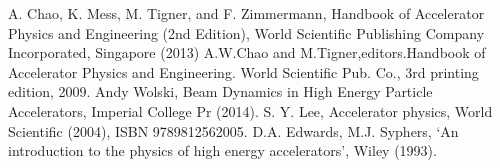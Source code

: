\documentclass[10pt,a4paper]{ltjsarticle}
\begin{document}
%
\begin{thebibliography}{9}
  A. Chao, K. Mess, M. Tigner, and F. Zimmermann, Handbook of Accelerator Physics and Engineering (2nd Edition), World Scientific Publishing Company Incorporated, Singapore (2013)
  A.W.Chao and M.Tigner,editors.Handbook of Accelerator Physics and Engineering. World Scientific Pub. Co., 3rd printing edition, 2009.
  Andy Wolski, Beam Dynamics in High Energy Particle Accelerators,  Imperial College Pr (2014).
  S. Y. Lee, Accelerator physics, World Scientific (2004), ISBN 9789812562005.
  D.A. Edwards, M.J. Syphers, `An introduction to the physics of high energy accelerators', Wiley (1993).
\end{thebibliography}
%
\end{document}
